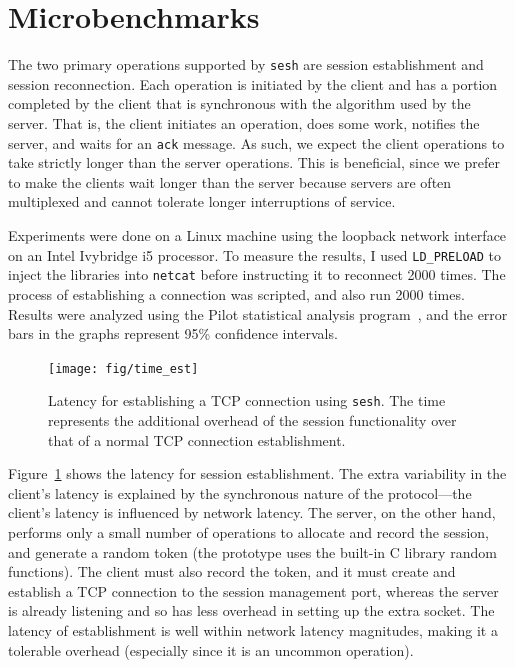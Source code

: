 \documentclass[twocolumn,11pt]{article}
\newcommand{\sesh}{\texttt{sesh}\xspace}
\begin{document}
\section{Microbenchmarks}

The two primary operations supported by \sesh are session establishment and
session reconnection. Each operation is initiated by the client and has a
portion completed by the client that is synchronous with the algorithm used by
the server. That is, the client initiates an operation, does some work, notifies
the server, and waits for an \texttt{ack} message. As such, we expect the client
operations to take strictly longer than the server operations. This is
beneficial, since we prefer to make the clients wait longer than the server
because servers are often multiplexed and cannot tolerate longer interruptions
of service.

Experiments were done on a Linux machine using the loopback network
interface on an Intel Ivybridge i5 processor. To measure the results, I used
\texttt{LD\_PRELOAD} to inject the libraries into \texttt{netcat} before
instructing it to reconnect 2000 times. The process of establishing a connection
was scripted, and also run 2000 times. Results were analyzed using the Pilot
statistical analysis program~\cite{pilot}, and the error bars in the graphs
represent 95\% confidence intervals.

\begin{figure}[!htb]
	\centering
	\texttt{[image: fig/time\_est]}
	\caption{Latency for establishing a TCP connection using \sesh. The time
	represents the additional overhead of the session functionality over that of
	a normal TCP connection establishment.}
	\label{fig:est}
\end{figure}

Figure~\ref{fig:est} shows the latency for session establishment. The extra
variability in the client's latency is explained by the synchronous nature of
the protocol---the client's latency is influenced by network latency. The
server, on the other hand, performs only a small number of operations to
allocate and record the session, and generate a random token (the prototype uses
the built-in C library random functions). The client must also record the token,
and it must create and establish a TCP connection to the session management
port, whereas the server is already listening and so has less overhead in
setting up the extra socket.
The latency of establishment is well within network latency magnitudes, making
it a tolerable overhead (especially since it is an uncommon operation).
\end{document}

